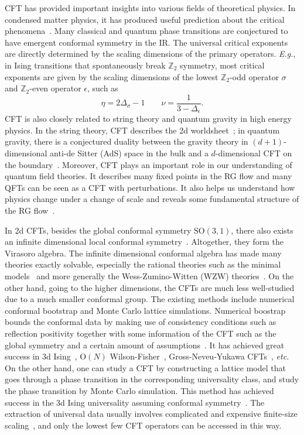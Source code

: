 \documentclass{timesjhep}
\begin{document}
CFT has provided important insights into various fields of theoretical physics. In condensed matter physics, it has produced useful prediction about the critical phenomena~\cite{Polyakov1970Conformal,Cardy1996Scaling,Sachdev2011Quantum}. Many classical and quantum phase transitions are conjectured to have emergent conformal symmetry in the IR. The universal critical exponents are directly determined by the scaling dimensions of the primary operators. \textit{E.g.}, in Ising transitions that spontaneously break $\mathbb{Z}_2$ symmetry, most critical exponents are given by the scaling dimensions of the lowest $\mathbb{Z}_2$-odd operator $\sigma$ and $\mathbb{Z}_2$-even operator $\epsilon$, such as 
\begin{equation}
    \eta=2\Delta_\sigma-1\qquad\nu=\frac{1}{3-\Delta_\epsilon}.
\end{equation} 
CFT is also closely related to string theory and quantum gravity in high energy physics. In the string theory, CFT describes the 2d worldsheet~; in quantum gravity, there is a conjectured duality between the gravity theory in $(d+1)$-dimensional anti-de Sitter (AdS) space in the bulk and a $d$-dimensional CFT on the boundary~\cite{Maldacena1998AdSCFT}. Moreover, CFT plays an important role in our understanding of quantum field theories. It describes many fixed points in the RG flow and many QFTs can be seen as a CFT with perturbations. It also helps us understand how physics change under a change of scale and reveals some fundamental structure of the RG flow~\cite{Zamolodchikov1986Irreversibility}. 

In 2d CFTs, besides the global conformal symmetry $\mathrm{SO}(3,1)$, there also exists an infinite dimensional local conformal symmetry~\cite{DiFrancesco1997CFT,Ginsparg1988CFT}. Altogether, they form the Virasoro algebra. The infinite dimensional conformal algebra has made many theories exactly solvable, especially the rational theories such as the minimal models~\cite{Belavin1984BPZ} and more generally the Wess-Zumino-Witten (WZW) theories~\cite{Wess1971WZW,Witten1983WZW}. On the other hand, going to the higher dimensions, the CFTs are much less well-studied due to a much smaller conformal group. The existing methods include numerical conformal bootstrap and Monte Carlo lattice simulations. Numerical boostrap bounds the conformal data by making use of consistency conditions such as reflection positivity together with some information of the CFT such as the global symmetry and a certain amount of assumptions~\cite{Poland2018Bootstrap,Rychkov2023Bootstrap}. It has achieved great success in 3d Ising~\cite{ElShowk2012Ising,Kos2016Ising}, $\mathrm{O}(N)$ Wilson-Fisher~\cite{Kos2015ON,Kos2016Ising}, Gross-Neveu-Yukawa CFTs~\cite{Iliesiu2015GNY}, \textit{etc.} On the other hand, one can study a CFT by constructing a lattice model that goes through a phase transition in the corresponding universality class, and study the phase transition by Monte Carlo simulation. This method has achieved success in the 3d Ising universality assuming conformal symmetry~\cite{Ferrenberg2018IsingMC}. The extraction of universal data usually involves complicated and expensive finite-size scaling~\cite{Cardy1996Scaling,Sandvik2010FSS,Fisher1972FSS}, and only the lowest few CFT operators can be accessed in this way. 
\end{document}
